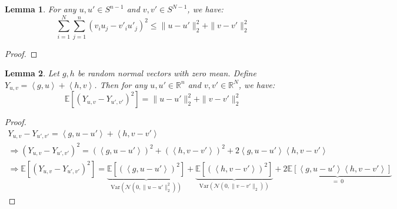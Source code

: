 \documentclass{article}
\newtheorem{lemma}{Lemma}[subsection]
\theoremstyle{remark}
\newcommand{\real}{\mathbb{R}}
\newcommand{\Exp}{\mathbb{E}}
\newcommand{\Var}{\mathrm{Var}}
\newcommand{\inner}[2]{\left\langle #1, #2 \right\rangle}
\newcommand{\calN}{\mathcal{N}}
\begin{document}
\begin{lemma}
\label{lem:inner-to-norm}
For any \(u, u' \in S^{n-1}\) and \(v, v' \in S^{N-1}\), we have:
\begin{equation*}
\sum_{i=1}^{N}\sum_{j=1}^{n}(v_{i}u_{j} - v'_{i}u'_{j})^{2} \leq \|u - u'\|_{2}^{2} + \|v - v'\|_{2}^{2}
\end{equation*}
\end{lemma}
\begin{proof}
\end{proof}

\begin{lemma}
\label{lem:linear-random-vec}
Let \(g, h\) be random normal vectors with zero mean. Define \(Y_{u, v} = \inner{g}{u} + \inner{h}{v}\). Then for any \(u, u' \in \real^{n}\) and \(v, v' \in \real^{N}\), we have:
\begin{equation*}
\Exp\left[(Y_{u, v} - Y_{u', v'})^{2}\right] = \|u - u'\|_{2}^{2} + \|v - v'\|_{2}^{2}
\end{equation*}
\end{lemma}
\begin{proof}
\begin{gather*}
Y_{u, v} - Y_{u', v'} = \inner{g}{u - u'} + \inner{h}{v - v'} \\
\Rightarrow (Y_{u, v} - Y_{u', v'})^{2} = (\inner{g}{u - u'})^{2} + (\inner{h}{v - v'})^{2} + 2\inner{g}{u - u'}\inner{h}{v - v'} \\
\Rightarrow \Exp\left[(Y_{u, v} - Y_{u', v'})^{2}\right] = \underbrace{\Exp\left[(\inner{g}{u - u'})^{2}\right]}_{\Var(\calN(0, \|u - u'\|_{2}^{2}))} + \underbrace{\Exp\left[(\inner{h}{v - v'})^{2}\right]}_{\Var(\calN(0, \|v - v'\|_{2}))} + \underbrace{2\Exp\left[\inner{g}{u - u'}\inner{h}{v - v'}\right]}_{=~0}
\end{gather*}
\end{proof}
\end{document}
